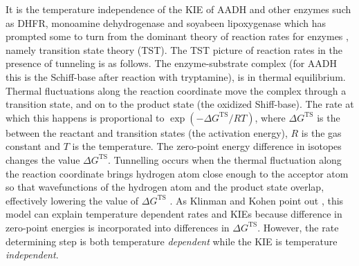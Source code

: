 
It is the temperature independence of the KIE of AADH and other enzymes such as DHFR, monoamine dehydrogenase and soyabeen lipoxygenase \cite{glowackiTakingOckhamRazor2012b} which has prompted some to turn from the dominant theory of reaction rates for enzymes \cite{klinmanbeyond2009}, namely transition state theory \cite{garciavilocaHowEnzymesWork2004} (TST). The TST picture of reaction rates in the presence of tunneling is as follows. The enzyme-substrate complex (for AADH this is the Schiff-base after reaction with tryptamine), is in thermal equilibrium. Thermal fluctuations along the reaction coordinate move the complex through a transition state, and on to the product state (the oxidized Shiff-base). The rate at which this happens is proportional to $\exp{(-\Delta G^{\mathrm{TS}}/RT)}$, where  $\Delta G^{\mathrm{TS}}$ is the between the reactant and transition states (the activation energy), $R$ is the gas constant and $T$ is the temperature. The zero-point energy difference in isotopes changes the value $\Delta G^{\mathrm{TS}}$. Tunnelling occurs when the thermal fluctuation along the reaction coordinate brings hydrogen atom close enough to the acceptor atom so that wavefunctions of the hydrogen atom and the product state overlap, effectively lowering the value of $\Delta G^{\mathrm{TS}}$ \cite{puMultidimensionalTunnelingRecrossing2006}.  As Klinman and Kohen point out \cite{klinmanHydrogenTunnelingLinks2013}, this model can explain temperature dependent rates and KIEs because difference in zero-point energies is incorporated into differences in $\Delta G^{\mathrm{TS}}$. However, the rate determining step is both temperature \emph{dependent} while the KIE is temperature \emph{independent}. 

